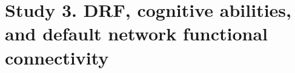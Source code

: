
\section{Study 3. DRF, cognitive abilities, and default network functional connectivity}
\label{sec:problematic:dmn-crea}

